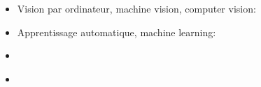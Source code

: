 {{%
\section*{\BrochureWebsitesAndKeywords}
{\raggedright
\begin{itemize}
  \item Vision par ordinateur, machine vision, computer vision: \href{https://fr.wikipedia.org/wiki/Vision_par_ordinateur}{}
  \item Apprentissage automatique, machine learning: \href{https://fr.wikipedia.org/wiki/Apprentissage_automatique}{}
  \item \href{https://fr.wikipedia.org/wiki/Stephen_Hawking\#Maladie_et_poursuite_de_ses_travaux}{}
  \item \href{https://fr.wikipedia.org/wiki/Tourneur_de_pages}{}
\end{itemize}


}

}{}

\def\AuthorWeigendM{} %
\def\AuthorTemplonuevoE{} %
\def\AuthorDatzkoC{} %
\def\AuthorDatzkoS{} %
\def\AuthorPelletE{} %

\newpage}{}
